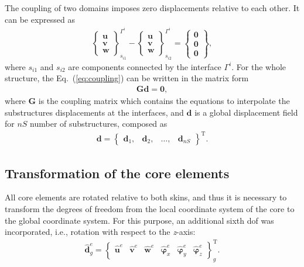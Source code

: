 \documentclass[a4paper,fleqn]{cas-dc}
\begin{document}
The coupling of two domains imposes zero displacements relative to each other.
It can be expressed as
\begin{eqnarray}
	\left\{\begin{array}{c}
		\textbf{u}\\
		\textbf{v}\\
		\textbf{w}
	\end{array}\right\}_{s_{i1}}^{\Gamma^i}-
	\left\{\begin{array}{c}
		\textbf{u}\\
		\textbf{v}\\
		\textbf{w}
	\end{array}\right\}_{s_{i2}}^{\Gamma^i}=
	\left\{\begin{array}{c}
		\textbf{0}\\
		\textbf{0}\\
		\textbf{0}
	\end{array}\right\},
	\label{eq:coupling}
\end{eqnarray}
where \(s_{i1}\) and \(s_{i2}\) are components connected by the interface \(\Gamma^i\).
For the whole structure, the Eq.~(\ref{eq:coupling}) can be written in the matrix form
\begin{eqnarray}
	\textbf{G}\textbf{d}=\textbf{0},
	\label{eq:cond_disp}
\end{eqnarray}
where \textbf{G} is the coupling matrix which contains the equations to interpolate the substructures displacements at the interfaces, and \(\textbf{d}\) is a global displacement field for \(nS\) number of substructures, composed as
\begin{eqnarray}
	\textbf{d} = \left\{\begin{array}{cccc}
		\textbf{d}_1, & \textbf{d}_2, &\ldots, & \textbf{d}_{nS}
	\end{array}\right\}^{\mathrm{T}}.
	\label{eq:displacements}
\end{eqnarray}

\subsection{Transformation of the core elements}

All core elements are rotated relative to both skins, and thus it is necessary to transform the degrees of freedom from the local coordinate system of the core to the global coordinate system.
For this purpose, an additional sixth \ac{dof} was incorporated, i.e., rotation with respect to the \textit{z}-axis:
\begin{eqnarray}
	\widehat{\textbf{d}}^e_g = \left \{\begin{array}{cccccc}
		\widehat{\textbf{u}}^e & \widehat{\textbf{v}}^e &
		\widehat{\textbf{w}}^e & \widehat{\boldsymbol{\varphi}}_x^e &
		\widehat{\boldsymbol{\varphi}}_y^e & \widehat{\boldsymbol{\varphi}}_z^e
	\end{array}\right \}^{\mathrm{T}}_g.
	\label{eq:d6}
\end{eqnarray}
\end{document}
